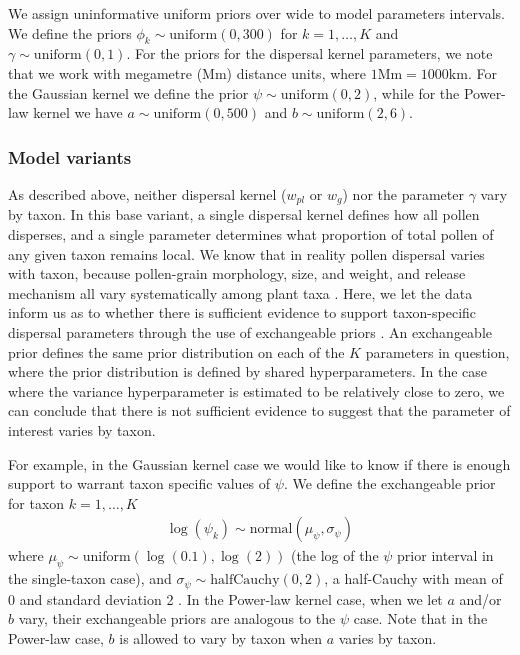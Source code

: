 \documentclass[12pt]{article}
\begin{document}
We assign uninformative uniform priors over wide to model parameters
intervals. We define the priors $\phi_k \sim \text{uniform}(0, 300)$
for $k=1, \ldots, K$ and $\gamma \sim \text{uniform}(0,1)$. For the
priors for the dispersal kernel parameters, we note that we work with
megametre (Mm) distance units, where $1 \text{Mm} = 1000
\text{km}$. For the Gaussian kernel we define the prior $\psi \sim
\text{uniform}(0, 2)$, while for the Power-law kernel we have $a \sim
\text{uniform}(0, 500)$ and $b \sim \text{uniform}(2, 6)$.

\subsubsection{Model variants}

As described above, neither dispersal kernel ($w_{pl}$ or $w_g$) nor
the parameter $\gamma$ vary by taxon. In this base variant, a single
dispersal kernel defines how all pollen disperses, and a single
parameter determines what proportion of total pollen of any given
taxon remains local. We know that in reality pollen dispersal varies
with taxon, because pollen-grain morphology, size, and weight, and
release mechanism all vary systematically among plant taxa
\citep{jackson1999pollen}. Here, we let the data inform us as to
whether there is sufficient evidence to support taxon-specific
dispersal parameters through the use of exchangeable priors
\citep{gelman2014bayesian}. An exchangeable prior defines the same
prior distribution on each of the $K$ parameters in question, where
the prior distribution is defined by shared hyperparameters. In the
case where the variance hyperparameter is estimated to be relatively
close to zero, we can conclude that there is not sufficient evidence
to suggest that the parameter of interest varies by taxon.

For example, in the Gaussian kernel case we would like to know
if there is enough support to warrant taxon specific values of
$\psi$. We define the exchangeable prior for taxon $k=1, \ldots, K$
\begin{align}
\log(\psi_k) \sim \text{normal}( \mu_{\psi}, \sigma_{\psi})
\end{align}
where $\mu_{\psi} \sim \text{uniform}(\log(0.1),\log(2))$ (the log of
the $\psi$ prior interval in the single-taxon case), and
$\sigma_{\psi} \sim \text{halfCauchy}(0, 2)$, a half-Cauchy with mean
of 0 and standard deviation 2 \citep{gelman2006prior}. In the
Power-law kernel case, when we let $a$ and/or $b$ vary, their
exchangeable priors are analogous to the $\psi$ case. Note that in the
Power-law case, $b$ is allowed to vary by taxon when $a$ varies by
taxon.
\end{document}
